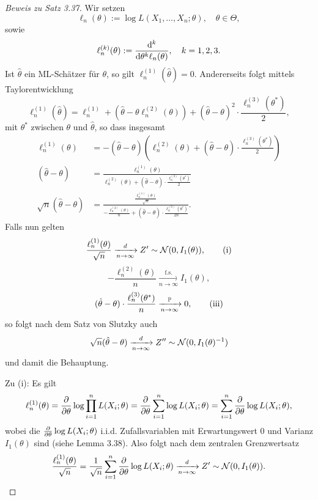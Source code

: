 \begin{proof}[Beweis zu Satz 3.37]
  Wir setzen
  \[ \ell_n(\theta) := \log L(X_1, \ldots, X_n; \theta), \quad \theta \in
    \Theta, \]
  sowie
  \[ \ell^{(k)}_n(\theta) := \frac{\mathrm{d}^k}{\mathrm{d} \theta^k \ell_n(\theta)},
    \quad k = 1, 2, 3. \]
  Ist $\hat{\theta}$ ein ML-Schätzer für $\theta$, so gilt
  $\ell_n^{(1)}(\hat{\theta}) = 0$. Andererseits folgt mittels Taylorentwicklung
  \[ \ell_n^{(1)}(\hat{\theta}) = \ell_n^{(1)} + (\hat{\theta} - \theta
    \ell_n^{(2)}(\theta)) + (\hat{\theta} - \theta)^2 \cdot
    \frac{\ell_n^{(3)}(\theta^*)}{2}, \]
  mit $\theta^*$ zwischen $\theta$ und $\hat{\theta}$, so dass insgesamt
  \begin{align*}
    \ell_n^{(1)}(\theta)
    &= -(\hat{\theta}-\theta) \left( \ell_n^{(2)}(\theta)
      + (\hat{\theta}-\theta) \cdot \frac{\ell_n^{(3)}(\theta^*)}{2} \right) \\
    (\hat{\theta}-\theta)
    &= \frac{\ell_n^{(1)}(\theta)}{\ell_n^{(2)}(\theta)
      + (\hat{\theta}-\theta) \cdot \frac{\ell_n^{(3)}(\theta^*)}{2}} \\
    \sqrt{n} (\hat{\theta}-\theta)
    &= \frac{\frac{\ell_n^{(1)}(\theta)}{\sqrt{n}}}{
      - \frac{\ell_n^{(2)}(\theta)}{n}
      + (\hat{\theta}-\theta) \cdot \frac{\ell_n^{(3)}(\theta^*)}{2n}}.
  \end{align*}
  Falls nun gelten
  \[ \frac{\ell_n^{(1)}(\theta)}{\sqrt{n}} \xrightarrow[n \to \infty]{d} Z'
    \sim \mathcal{N}(0,I_1(\theta)), \tag{i} \]
  \[ - \frac{\ell_n^{(2)}(\theta)}{n} \xrightarrow[n \to \infty]{\text{f.s.}}
    I_1(\theta), \tag{ii} \]
  \[ (\hat{\theta}-\theta) \cdot \frac{\ell_n^{(3)}(\theta^*)}{n}
    \xrightarrow[n \to \infty]{\mathbb{P}} 0, \tag{iii} \]
  so folgt nach dem Satz von Slutzky auch
  \[ \sqrt{n} (\hat{\theta}-\theta) \xrightarrow[n \to \infty]{d}
    Z'' \sim \mathcal{N}(0, I_1(\theta)^{-1})\]
  und damit die Behauptung.

  Zu (i): Es gilt
  \[ \ell_n^{(1)}(\theta) = \frac{\partial }{\partial \theta} \log \prod_{i=1}^n L(X_i;\theta)
    = \frac{\partial }{\partial \theta} \sum_{i=1}^n \log L(X_i;\theta)
    = \sum_{i=1}^n \frac{\partial }{\partial \theta} \log L(X_i;\theta), \]
  wobei die $\frac{\partial }{\partial \theta} \log L(X_i;\theta)$ i.i.d. Zufallsvariablen mit
  Erwartungswert 0 und Varianz $I_1(\theta)$ sind (siehe Lemma 3.38). Also folgt
  nach dem zentralen Grenzwertsatz
  \[ \frac{\ell_n^{(1)}(\theta)}{\sqrt{n}} = \frac{1}{\sqrt{n}} \sum_{i=1}^n
    \frac{\partial }{\partial \theta} \log L(X_i;\theta) \xrightarrow[n \to \infty]{d}
    Z' \sim \mathcal{N}(0,I_1(\theta)). \]


\end{proof}
